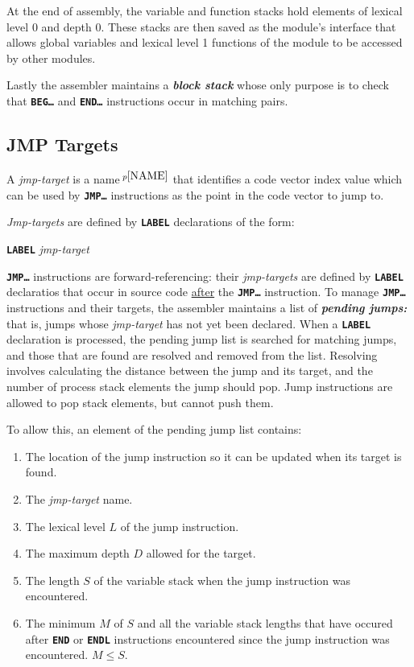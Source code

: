 \documentclass[12pt]{article}
\makeatletter
\newcommand{\TT}[1]{{\tt \bfseries #1}}
\newcommand{\key}[1]{{\bf \em #1}\index{#1}}
\newcommand{\skey}[2]{{\bf \em #1#2}\index{#1}}
\newcommand{\ttkey}[1]{\TT{#1}\index{#1@{\tt #1}}}
\newcommand{\pagnote}[1]{$\,^{p\pageref{#1}}$}
\makeatother
\begin{document}
At the end of assembly, the variable and function stacks hold
elements of lexical level 0 and depth 0.  These stacks are then
saved as the module's interface that allows global variables
and lexical level 1 functions of the module to be accessed by
other modules.

Lastly the assembler maintains a \key{block stack} whose only
purpose is to check that \TT{BEG\ldots} and \TT{END\ldots} instructions
occur in matching pairs.

\subsection{JMP Targets}
\label{JMP-TARGETS}

A {\em jmp-target} is a name\pagnote{NAME} that identifies
a code vector index value which can be used by \TT{JMP\ldots}
instructions as the point in the code vector to jump to.

{\em Jmp-targets} are defined by \TT{LABEL} declarations
of the form:
\begin{center}
\ttkey{LABEL} {\em jmp-target}
\end{center}

\TT{JMP\ldots} instructions are forward-referencing: their
{\em jmp-targets} are defined by \TT{LABEL} declaratios that
occur in source code \underline{after} the \TT{JMP\ldots} instruction.
To manage \TT{JMP\ldots} instructions and their targets,
the assembler maintains a list of \skey{pending jumps}:
that is, jumps whose {\em jmp-target} has not yet been
declared.  When a \TT{LABEL} declaration is processed,
the pending jump list is searched for matching jumps,
and those that are found are resolved and removed from
the list.  Resolving involves calculating the distance
between the jump and its target, and the number of
process stack elements the jump should pop.  Jump instructions
are allowed to pop stack elements, but cannot push them.

To allow this, an element of the pending jump list contains:
\begin{enumerate}
\item The location of the jump instruction so it can be updated
when its target is found.
\item The {\em jmp-target} name.
\item The lexical level $L$ of the jump instruction.
\item The maximum depth $D$ allowed for the target.
\item The length $S$ of the variable stack when the jump instruction
      was encountered.
\item The minimum $M$ of $S$ and all the variable stack lengths that have
      occured after \TT{END} or \TT{ENDL} instructions encountered
      since the jump instruction was encountered.
      $M\le S$.
\end{enumerate}
\end{document}
